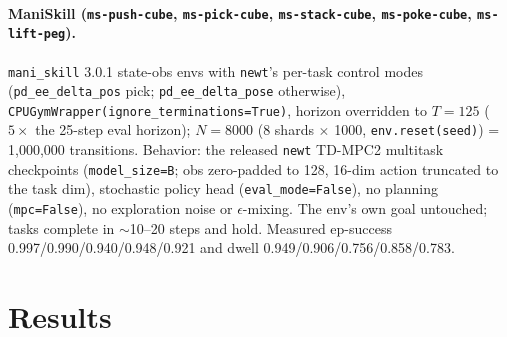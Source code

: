 \documentclass[10pt]{article}
\begin{document}
\paragraph{ManiSkill (\texttt{ms-push-cube}, \texttt{ms-pick-cube}, \texttt{ms-stack-cube}, \texttt{ms-poke-cube}, \texttt{ms-lift-peg}).}
\texttt{mani\_skill} 3.0.1 state-obs envs with \texttt{newt}'s per-task control modes (\texttt{pd\_ee\_delta\_pos} pick; \texttt{pd\_ee\_delta\_pose} otherwise), \texttt{CPUGymWrapper(ignore\_terminations=True)}, horizon overridden to $T=125$ ($5\times$ the 25-step eval horizon); $N=8000$ (8 shards $\times$ 1000, \texttt{env.reset(seed)}) = 1,000,000 transitions. Behavior: the released \texttt{newt} TD-MPC2 multitask checkpoints (\texttt{model\_size=B}; obs zero-padded to 128, 16-dim action truncated to the task dim), stochastic policy head (\texttt{eval\_mode=False}), no planning (\texttt{mpc=False}), no exploration noise or $\epsilon$-mixing. The env's own goal untouched; tasks complete in $\sim$10--20 steps and hold. Measured ep-success 0.997/0.990/0.940/0.948/0.921 and dwell 0.949/0.906/0.756/0.858/0.783.

\section{Results}
\end{document}
